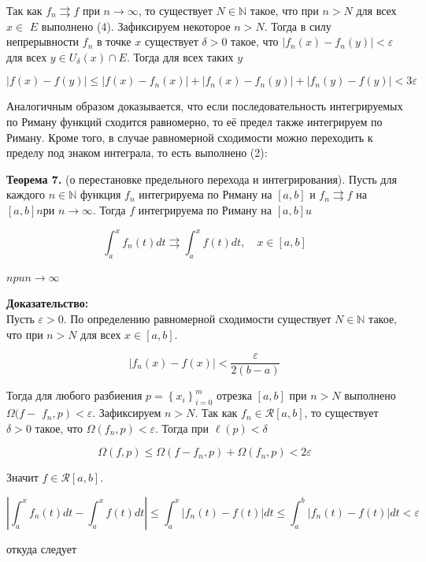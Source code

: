 \documentclass[a4paper,12pt]{article} %
\begin{document}
	Так как $f_{n} \rightrightarrows f$ при $n \rightarrow \infty$, то существует $N \in \mathbb{N}$ такое, что при $n>N$ для всех $x \in$ $E$ выполнено (4). Зафиксируем некоторое $n>N$. Тогда в силу непрерывности $f_{n}$ в точке $x$ существует $\delta>0$ такое, что $\left|f_{n}(x)-f_{n}(y)\right|<\varepsilon$ для всех $y \in U_{\delta}(x) \cap E$. Тогда для всех таких $y$
	
	$$
	|f(x)-f(y)| \leq\left|f(x)-f_{n}(x)\right|+\left|f_{n}(x)-f_{n}(y)\right|+\left|f_{n}(y)-f(y)\right|<3 \varepsilon
	$$
	
	Аналогичным образом доказывается, что если последовательность интегрируемых по Риману функций сходится равномерно, то её предел также интегрируем по Риману. Кроме того, в случае равномерной сходимости можно переходить к пределу под знаком интеграла, то есть выполнено (2):
	
	\textbf{Теорема 7.} (о перестановке предельного перехода и интегрирования). Пусть для каждого $n \in \mathbb{N}$ функция $f_{n}$ интегрируема по Риману на $[a, b]$ и $f_{n} \rightrightarrows f$ на $[a, b] n р и$ $n \rightarrow \infty$. Тогда $f$ интегрируема по Риману на $[a, b] u$
	
	$$
	\int_{a}^{x} f_{n}(t) d t \rightrightarrows \int_{a}^{x} f(t) d t, \quad x \in[a, b]
	$$
	
	$n p u n \rightarrow \infty$
	
	\textbf{Доказательство:\\}
	Пусть $\varepsilon>0$. По определению равномерной сходимости существует $N \in \mathbb{N}$ такое, что при $n>N$ для всех $x \in[a, b]$.
	
	$$
	\left|f_{n}(x)-f(x)\right|<\frac{\varepsilon}{2(b-a)}
	$$
	
	Тогда для любого разбиения $p=\left\{x_{i}\right\}_{i=0}^{m}$ отрезка $[a, b]$ при $n>N$ выполнено $\Omega(f-$ $\left.f_{n}, p\right)<\varepsilon$. Зафиксируем $n>N$. Так как $f_{n} \in \mathcal{R}[a, b]$, то существует $\delta>0$ такое, что $\Omega\left(f_{n}, p\right)<\varepsilon$. Тогда при $\ell(p)<\delta$
	
	$$
	\Omega(f, p) \leq \Omega\left(f-f_{n}, p\right)+\Omega\left(f_{n}, p\right)<2 \varepsilon
	$$
	
	Значит $f \in \mathcal{R}[a, b]$.
	
	$$
	\left|\int_{a}^{x} f_{n}(t) d t-\int_{a}^{x} f(t) d t\right| \leq \int_{a}^{x}\left|f_{n}(t)-f(t)\right| d t \leq \int_{a}^{b}\left|f_{n}(t)-f(t)\right| d t<\varepsilon
	$$
	
	откуда следует
	
\end{document}
